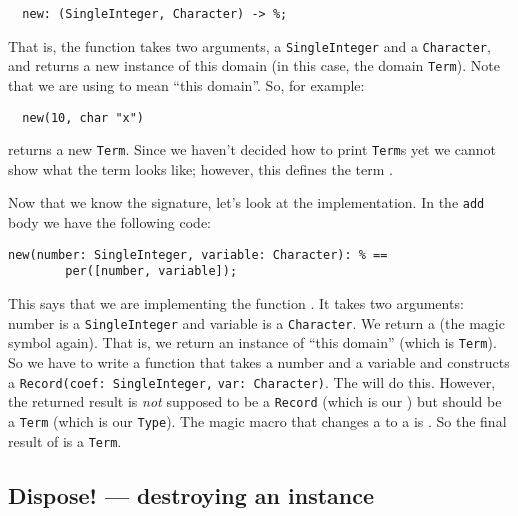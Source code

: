 \begin{small}
\begin{verbatim}
  new: (SingleInteger, Character) -> %;
\end{verbatim}
\end{small}

That is, the function  takes two arguments,
a \verb"SingleInteger" and a \verb"Character",
and returns a new instance of this domain (in this case,
the domain \verb"Term"). Note that we are using \ttin{\%} to mean ``this domain''.
So, for example:

\begin{small}
\begin{verbatim}
  new(10, char "x") 
\end{verbatim}
\end{small}

returns a new \verb"Term". Since we haven't decided how to print \verb"Term"s yet
we cannot show what the term looks like; however, this defines the
term .

Now that we know the signature, let's look at the implementation. In the
\verb"add" body we have the following code:

\begin{small}
\begin{verbatim}
new(number: SingleInteger, variable: Character): % ==
        per([number, variable]);
\end{verbatim}
\end{small}

This says that we are implementing the function . It takes two
\linebreak
arguments: number is a \verb"SingleInteger" and variable is a
\verb"Character".
We return a \ttin{\%} (the magic symbol again). That is, we return an
instance of ``this domain'' (which is \verb"Term"). So we have to write a
function that takes a number and a variable and constructs a 
\verb"Record(coef: SingleInteger," \verb"var: Character)".
The 
will do this. However, the returned result is {\em not\/} supposed to
be a \verb"Record" (which is our ) but should be a \verb"Term" (which is
our \verb"Type").  The magic macro that changes a  to a \ttin{\%}
is . So the final result of  is a
\verb"Term".

\subsection{Dispose! --- destroying an instance }

